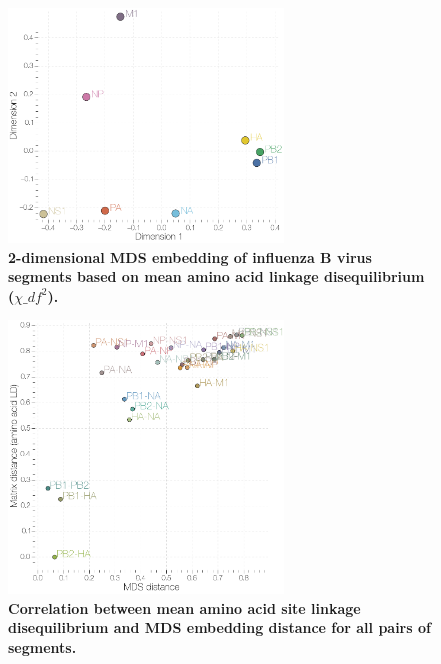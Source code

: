 \documentclass[11pt,oneside,letterpaper]{article}
\begin{document}
\begin{figure}
\centering  
\includegraphics[width=0.65\textwidth]  {supp_figures/InfB_8x8_aaLD_MDS.png}
\caption{\textbf{2-dimensional MDS embedding of influenza B virus segments based on mean amino acid linkage disequilibrium ($\chi\_{df}^{2}$).}}
\label{MDSaaLD}
\end{figure}

\begin{figure}
\centering  
\includegraphics[width=0.65\textwidth]  {supp_figures/InfB_aaLD_MatrixMDScorr.png}
\caption{\textbf{Correlation between mean amino acid site linkage disequilibrium and MDS embedding distance for all pairs of segments.}}
\label{MDSaaCorr}
\end{figure}
\end{document}
